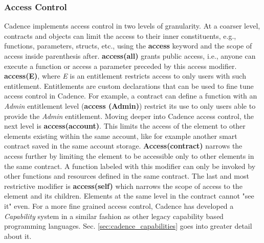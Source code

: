 \documentclass[../NFTComp_IEEE.tex]{subfiles}
\begin{document}
\subsubsection{Access Control}
Cadence implements access control in two levels of granularity. At a coarser level, contracts and objects can limit the access to their inner constituents, e.g., functions, parameters, structs, etc., using the \textbf{access} keyword and the scope of access inside parenthesis after. \textbf{access(all)} grants public access, i.e., anyone can execute a function or access a parameter preceded by this access modifier. \textbf{access(E)}, where \textit{E} is an entitlement restricts access to only users with such entitlement. Entitlements are custom declarations that can be used to fine tune access control in Cadence. For example, a contract can define a function with an \textit{Admin} entitlement level (\textbf{access (Admin)}) restrict its use to only users able to provide the \textit{Admin} entitlement. Moving deeper into Cadence access control, the next level is \textbf{access(account)}. This limits the access of the element to other elements existing within the same account, like for example another smart contract saved in the same account storage. \textbf{Access(contract)} narrows the access further by limiting the element to be accessible only to other elements in the same contract. A function labeled with this modifier can only be invoked by other functions and resources defined in the same contract. The last and most restrictive modifier is \textbf{access(self)} which narrows the scope of access to the element and its children. Elements at the same level in the contract cannot "see it" even. For a more fine grained access control, Cadence has developed a \textit{Capability} system in a similar fashion as other legacy capability based programming languages. Sec. \ref{sec:cadence_capabilities} goes into greater detail about it.
\end{document}
